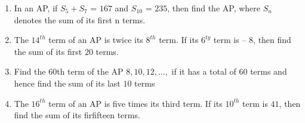 \begin{enumerate}
\item In an AP, if $S_5 + S_7$ = $167$ and $S_10$ = $235$, then find the AP, where $S_n$ denotes the sum of its first n terms.
\item The $14^{th}$ term of an AP is twice its $8^{th}$ term. If its $6^{ty}$ term is – $8$, then find the sum of its first $20$ terms.
\item Find the 60th term of the AP $8, 10, 12, ...,$ if it has a total of 60 terms and hence find the sum of its last $10$ terms
\item The $16^{th}$ term of an {AP} is five times its third term. If its $10^{th}$ term is $41$, then find the sum of its firfifteen terms.
\end{enumerate}
